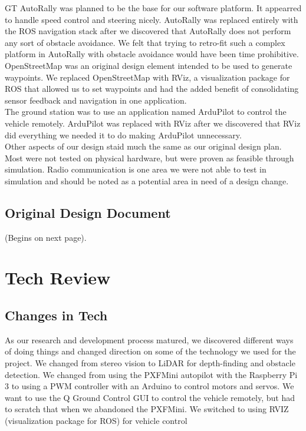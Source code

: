 \documentclass[compsoc,draftclsnofoot,onecolumn,10pt]{IEEEtran}
\begin{document}
GT AutoRally was planned to be the base for our software platform. It appearred to handle speed control and steering nicely. AutoRally was replaced entirely with the ROS navigation stack after we discovered that AutoRally does not perform any sort of obstacle avoidance. We felt that trying to retro-fit such a complex platform in AutoRally with obstacle avoidance would have been time prohibitive. OpenStreetMap was an original design element intended to be used to generate waypoints. We replaced OpenStreetMap with RViz, a visualization package for ROS that allowed us to set waypoints and had the added benefit of consolidating sensor feedback and navigation in one application.\\
The ground station was to use an application named ArduPilot to control the vehicle remotely. ArduPilot was replaced with RViz after we discovered that RViz did everything we needed it to do making ArduPilot unnecessary.\\
Other aspects of our design staid much the same as our original design plan. Most were not tested on physical hardware, but were proven as feasible through simulation. Radio communication is one area we were not able to test in simulation and should be noted as a potential area in need of a design change.


\subsection{Original Design Document}
(Begins on next page).




\clearpage 
\section{Tech Review}
\subsection{Changes in Tech}
As our research and development process matured, we discovered different ways of doing things and changed direction on some of the technology we used for the project. 
We changed from stereo vision to LiDAR for depth-finding and obstacle detection. 
We changed from using the PXFMini autopilot with the Raspberry Pi 3 to using a PWM controller with an Arduino to control motors and servos. 
We want to use the Q Ground Control GUI to control the vehicle remotely, but had to scratch that when we abandoned the PXFMini. 
We switched to using RVIZ (visualization package for ROS) for vehicle control
\end{document}

